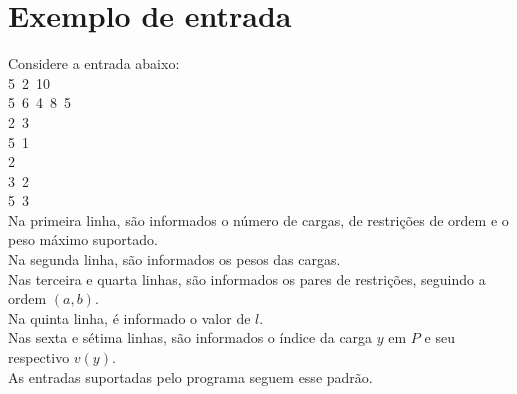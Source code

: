 \documentclass{article}
\begin{document}
\newpage
\section{Exemplo de entrada}
Considere a entrada abaixo:\\
    5\mbox{ }2\mbox{ }10\\
    5\mbox{ }6\mbox{ }4\mbox{ }8\mbox{ }5\\
    2\mbox{ }3\\
    5\mbox{ }1\\
    2\\
    3\mbox{ }2\\
    5\mbox{ }3\\
Na primeira linha, são informados o número de cargas, de restrições de ordem e o peso máximo suportado.\\
Na segunda linha, são informados os pesos das cargas.\\
Nas terceira e quarta linhas, são informados os pares de restrições, seguindo a ordem $(a, b)$.\\
Na quinta linha, é informado o valor de $l$.\\
Nas sexta e sétima linhas, são informados o índice da carga $y$ em $P$ e seu respectivo $v(y)$.\\
As entradas suportadas pelo programa seguem esse padrão.
\end{document}
